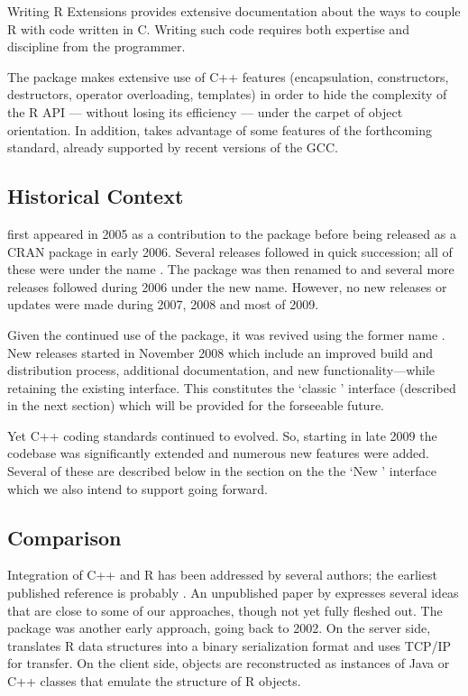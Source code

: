 Writing R Extensions \citep{R:exts} provides extensive 
documentation about the ways to couple R with code written in C. 
Writing such code requires both expertise and discipline from the 
programmer.

The  package makes extensive use of C++ features (encapsulation, 
constructors, destructors, operator overloading, templates) in order
to hide the complexity of the R API --- without losing its 
efficiency --- under the carpet of object orientation. In addition, 
 takes advantage of some features of the forthcoming  
standard, already supported by recent versions of the GCC.

\subsection{Historical Context}

 first appeared in 2005 as a contribution to the 
package \citep{eddelbuettelkhan09:rquantlib} before being released as a CRAN
package in early 2006. Several releases followed in quick succession; all of
these were under the name . The package was then renamed to
 and several more releases followed during 2006 under the
new name.  However, no new releases or updates were made during 2007, 2008
and most of 2009.

Given the continued use of the package, it was revived using the former name
. New releases started in November 2008 which include an improved
build and distribution process, additional documentation, and new
functionality---while retaining the existing interface.  This constitutes the
`classic ' interface (described in the next section)
which will be provided for the forseeable future.

Yet C++ coding standards continued to evolved. So, starting in late 2009 the
codebase was significantly extended and numerous new features were added.
Several of these are described below in the section on the the `New
' interface which we also intend to support going forward.

\subsection{Comparison}

Integration of C++ and R has been addressed by several authors; the earliest
published reference is probably \cite{batesdebroy01:cppclasses}.
An unpublished paper by \cite{javagailemanly07:r_cpp} expresses several ideas
that are close to some of our approaches, though not yet fully fleshed out.
%
The  package \citep{cran:Rserve} was another early approach,
going back to 2002. On the server side,  translates R data
structures into a binary serialization format and uses TCP/IP for
transfer. On the client side, objects are reconstructed as instances of Java
or C++ classes that emulate the structure of R objects. 

